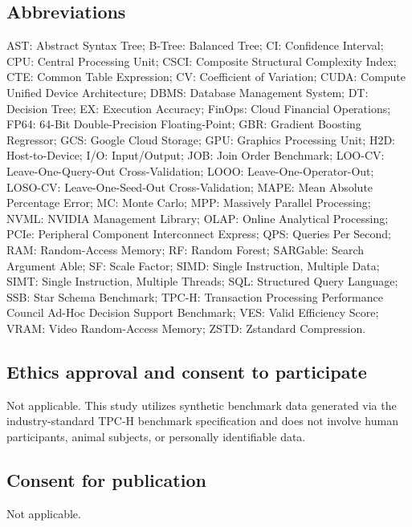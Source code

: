 \documentclass[10pt,a4paper]{article}
\begin{document}
\subsection*{Abbreviations}
AST: Abstract Syntax Tree; B-Tree: Balanced Tree; CI: Confidence Interval; CPU: Central Processing Unit; CSCI: Composite Structural Complexity Index; CTE: Common Table Expression; CV: Coefficient of Variation; CUDA: Compute Unified Device Architecture; DBMS: Database Management System; DT: Decision Tree; EX: Execution Accuracy; FinOps: Cloud Financial Operations; FP64: 64-Bit Double-Precision Floating-Point; GBR: Gradient Boosting Regressor; GCS: Google Cloud Storage; GPU: Graphics Processing Unit; H2D: Host-to-Device; I/O: Input/Output; JOB: Join Order Benchmark; LOO-CV: Leave-One-Query-Out Cross-Validation; LOOO: Leave-One-Operator-Out; LOSO-CV: Leave-One-Seed-Out Cross-Validation; MAPE: Mean Absolute Percentage Error; MC: Monte Carlo; MPP: Massively Parallel Processing; NVML: NVIDIA Management Library; OLAP: Online Analytical Processing; PCIe: Peripheral Component Interconnect Express; QPS: Queries Per Second; RAM: Random-Access Memory; RF: Random Forest; SARGable: Search Argument Able; SF: Scale Factor; SIMD: Single Instruction, Multiple Data; SIMT: Single Instruction, Multiple Threads; SQL: Structured Query Language; SSB: Star Schema Benchmark; TPC-H: Transaction Processing Performance Council Ad-Hoc Decision Support Benchmark; VES: Valid Efficiency Score; VRAM: Video Random-Access Memory; ZSTD: Zstandard Compression.

\subsection*{Ethics approval and consent to participate}
Not applicable. This study utilizes synthetic benchmark data generated via the industry-standard TPC-H benchmark specification \cite{tpc2022tpch} and does not involve human participants, animal subjects, or personally identifiable data.

\subsection*{Consent for publication}
Not applicable.
\end{document}
